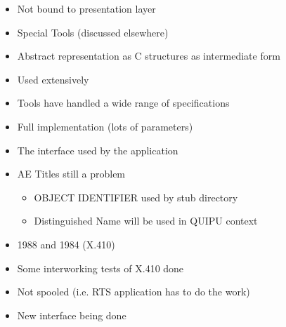 \begin {bwslide}

\begin {itemize}
\item Not bound to presentation layer
\item Special Tools (discussed elsewhere)
\item Abstract representation as C structures as intermediate form 
\item Used extensively
\item Tools have handled a wide range of specifications
\end {itemize}
\end {bwslide}

\begin {bwslide}
\begin {itemize}
\item Full implementation (lots of parameters)
\item The interface used by the application
\item AE Titles still a problem
\begin {itemize}
\item OBJECT IDENTIFIER used by stub directory
\item Distinguished Name will be used in QUIPU context
\end {itemize}

\end {itemize}
\end {bwslide}



\begin {bwslide}
\begin {itemize}
\item 1988 and 1984 (X.410)
\item Some interworking tests of X.410 done
\item Not spooled (i.e. RTS application has to do the work)
\item New interface being done
\end {itemize}
\end {bwslide}



